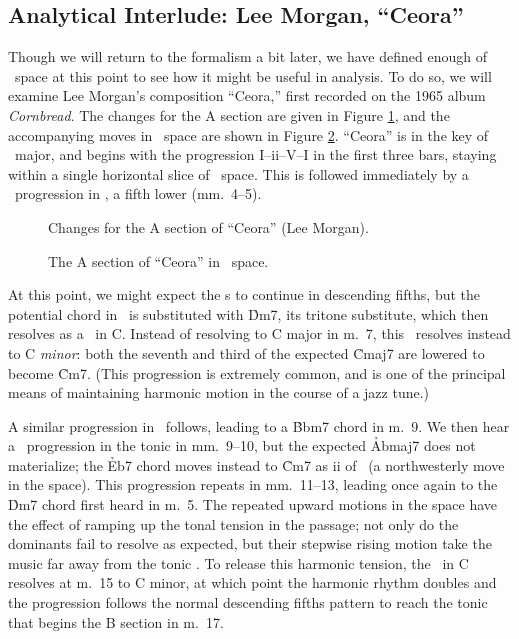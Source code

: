 


\FloatBarrier

\subsection{Analytical Interlude: Lee Morgan, “Ceora”}
\label{sec:ceora-analysis}

Though we will return to the formalism a bit later, we have defined enough of
\tf\ space at this point to see how it might be useful in analysis. To do so,
we will examine Lee Morgan's composition ``Ceora,'' first recorded on the 1965
album \emph{Cornbread}. The changes for the A section are given in
Figure \ref{tf:ceora-changes-1}, and the accompanying moves in \tf\ space are
shown in Figure \ref{tf:ceora-space-1}. ``Ceora'' is in the key of
\Aflat\ major, and begins with the progression I--ii--V--I in the first three
bars, staying within a single horizontal slice of \tf\ space. This is followed
immediately by a \tfo\ progression in \Dflat, a fifth lower (mm.~4--5).

\begin{figure}[thbp]
  \caption{Changes for the A section of ``Ceora'' (Lee Morgan).}
  \label{tf:ceora-changes-1}
\end{figure}

\begin{figure}[htbp]
  \caption{The A section of ``Ceora'' in \tf\ space.}
  \label{tf:ceora-space-1}
\end{figure}

At this point, we might expect the \tf{}s to continue in descending
fifths, but the potential \ii chord in \Gflat\ is substituted with
\h{Dm7}, its tritone substitute, which then resolves as a \tf\ in C.
Instead of resolving to C major in m.~7, this \tf\ resolves instead to C
\emph{minor}: both the seventh and third of the expected \h{Cmaj7} are lowered
to become \h{Cm7}. (This progression is extremely common, and is one of the
principal means of maintaining harmonic motion in the course of a jazz tune.)

A similar progression in \Bflat\ follows, leading to a \h{Bbm7} chord in m.~9.
We then hear a \tf\ progression in the tonic in mm.~9--10, but the
expected \h{Abmaj7} does not materialize; the \h{Eb7} chord moves instead to
\h{Cm7} as ii of \Bflat\ (a northwesterly move in the space). This
progression repeats in mm.~11--13, leading once again to the \h{Dm7} chord
first heard in m.~5. The repeated upward motions in the space have the
effect of ramping up the tonal tension in the passage; not only do the
dominants fail to resolve as expected, but their stepwise rising motion take
the music far away from the tonic \Aflat. To release this harmonic tension,
the \tf\ in C resolves at m.~15 to C minor, at which point the harmonic rhythm
doubles and the progression follows the normal descending fifths pattern to
reach the tonic that begins the B section in m.~17.

